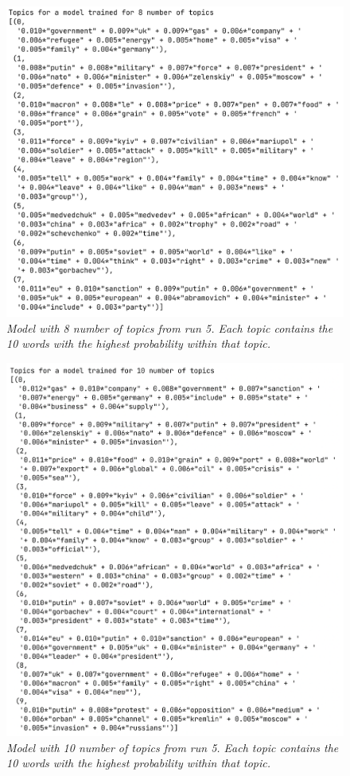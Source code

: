 \documentclass[twoside,12pt,a4paper]{article}
\begin{document}
\begin{figure}[h]
\centering
\includegraphics[scale=0.5]{8_topics.png}
\caption{\textit{Model with 8 number of topics from run 5. Each topic contains the 10 words with the highest probability within that topic.}}
\label{fig:8_topics}
\end{figure}

\begin{figure}[h]
\centering
\includegraphics[scale=0.5]{10_topics.png}
\caption{\textit{Model with 10 number of topics from run 5. Each topic contains the 10 words with the highest probability within that topic.}}
\label{fig:10_topics}
\end{figure}
\end{document}
